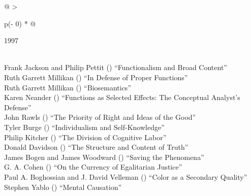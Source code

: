 \documentclass[
  10pt,
  letterpaper,
  DIV=11,
  numbers=noendperiod,
  twoside]{scrartcl}
\begin{document}
\begin{longtable}[]{@{}
  >{\raggedright\arraybackslash}p{(\columnwidth - 0\tabcolsep) * }@{}}

\caption{\label{tbl-top-ten-1988}Most cited articles published less than
ten years ago as of 1997.}

\tabularnewline

\toprule\noalign{}
\begin{minipage}[b]{\linewidth}\raggedright
1997
\end{minipage} \\
\midrule\noalign{}
\endhead
\bottomrule\noalign{}
\endlastfoot
Frank Jackson and Philip Pettit
()
``Functionalism and Broad Content'' \\
Ruth Garrett Millikan
()
``In Defense of Proper Functions'' \\
Ruth Garrett Millikan
()
``Biosemantics'' \\
Karen Neander
()
``Functions as Selected Effects: The Conceptual Analyst's Defense'' \\
John Rawls
()
``The Priority of Right and Ideas of the Good'' \\
Tyler Burge
()
``Individualism and Self-Knowledge'' \\
Philip Kitcher
()
``The Division of Cognitive Labor'' \\
Donald Davidson
()
``The Structure and Content of Truth'' \\
James Bogen and James Woodward
()
``Saving the Phenomena'' \\
G. A. Cohen
()
``On the Currency of Egalitarian Justice'' \\
Paul A. Boghossian and J. David Velleman
()
``Color as a Secondary Quality'' \\
Stephen Yablo
()
``Mental Causation'' \\

\end{longtable}
\end{document}
